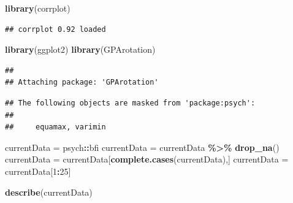 \documentclass[
]{ctexart}
\newenvironment{Shaded}{\begin{snugshade}}{\end{snugshade}}
\newcommand{\DecValTok}[1]{\textcolor[rgb]{0.00,0.00,0.81}{#1}}
\newcommand{\FunctionTok}[1]{\textcolor[rgb]{0.13,0.29,0.53}{\textbf{#1}}}
\newcommand{\NormalTok}[1]{#1}
\newcommand{\OtherTok}[1]{\textcolor[rgb]{0.56,0.35,0.01}{#1}}
\newcommand{\SpecialCharTok}[1]{\textcolor[rgb]{0.81,0.36,0.00}{\textbf{#1}}}
\begin{document}
\begin{Shaded}
\begin{Highlighting}[]
\FunctionTok{library}\NormalTok{(corrplot)}
\end{Highlighting}
\end{Shaded}

\begin{verbatim}
## corrplot 0.92 loaded
\end{verbatim}

\begin{Shaded}
\begin{Highlighting}[]
\FunctionTok{library}\NormalTok{(ggplot2)}
\FunctionTok{library}\NormalTok{(GPArotation)}
\end{Highlighting}
\end{Shaded}

\begin{verbatim}
## 
## Attaching package: 'GPArotation'
\end{verbatim}

\begin{verbatim}
## The following objects are masked from 'package:psych':
## 
##     equamax, varimin
\end{verbatim}

\begin{Shaded}
\begin{Highlighting}[]
\NormalTok{currentData }\OtherTok{=}\NormalTok{ psych}\SpecialCharTok{::}\NormalTok{bfi}
\NormalTok{currentData }\OtherTok{=}\NormalTok{ currentData }\SpecialCharTok{\%\textgreater{}\%} \FunctionTok{drop\_na}\NormalTok{()}
\NormalTok{currentData }\OtherTok{=}\NormalTok{ currentData[}\FunctionTok{complete.cases}\NormalTok{(currentData),]}
\NormalTok{currentData }\OtherTok{=}\NormalTok{ currentData[}\DecValTok{1}\SpecialCharTok{:}\DecValTok{25}\NormalTok{]}
\end{Highlighting}
\end{Shaded}

\begin{Shaded}
\begin{Highlighting}[]
\FunctionTok{describe}\NormalTok{(currentData)}
\end{Highlighting}
\end{Shaded}
\end{document}
